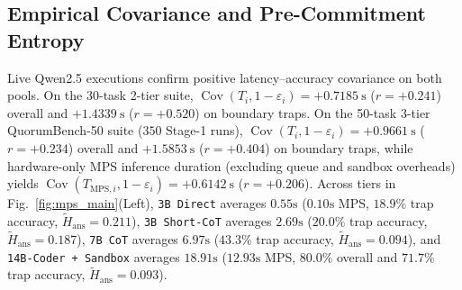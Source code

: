 \documentclass[conference]{IEEEtran}
\def\QBench{QuorumBench-50}%
\theoremstyle{definition}
\theoremstyle{remark}
\newcommand{\QBench}{\textsc{QuorumBench-50}}
\newcommand{\Htilde}{\tilde{H}_{\mathrm{ans}}}
\newcommand{\Cov}{\operatorname{Cov}}
\begin{document}
\subsection{Empirical Covariance and Pre-Commitment Entropy}
Live Qwen2.5 executions confirm positive latency--accuracy covariance on both pools. On the 30-task 2-tier suite, $\Cov(T_i, 1 - \varepsilon_i) = +0.7185~\mathrm{s}$ ($r = +0.241$) overall and $+1.4339~\mathrm{s}$ ($r = +0.520$) on boundary traps. On the 50-task 3-tier \QBench{} suite ($350$ Stage-1 runs), $\Cov(T_i, 1 - \varepsilon_i) = +0.9661~\mathrm{s}$ ($r = +0.234$) overall and $+1.5853~\mathrm{s}$ ($r = +0.404$) on boundary traps, while hardware-only MPS inference duration (excluding queue and sandbox overheads) yields $\Cov(T_{\mathrm{MPS}, i}, 1 - \varepsilon_i) = +0.6142~\mathrm{s}$ ($r = +0.206$). Across tiers in Fig.~\ref{fig:mps_main}(Left), \texttt{3B Direct} averages $0.55\text{s}$ ($0.10\text{s}$ MPS, $18.9\%$ trap accuracy, $\Htilde = 0.211$), \texttt{3B Short-CoT} averages $2.69\text{s}$ ($20.0\%$ trap accuracy, $\Htilde = 0.187$), \texttt{7B CoT} averages $6.97\text{s}$ ($43.3\%$ trap accuracy, $\Htilde = 0.094$), and \texttt{14B-Coder + Sandbox} averages $18.91\text{s}$ ($12.93\text{s}$ MPS, $80.0\%$ overall and $71.7\%$ trap accuracy, $\Htilde = 0.093$).
\end{document}
